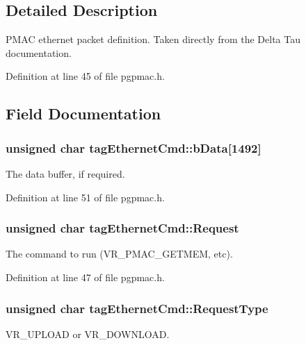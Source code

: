 \subsection{Detailed Description}
PMAC ethernet packet definition. Taken directly from the Delta Tau documentation. 

Definition at line 45 of file pgpmac.h.

\subsection{Field Documentation}
\hypertarget{structtagEthernetCmd_a872dab798127d6f589974a79c5d0aef1}{
\subsubsection[{bData}]{\setlength{\rightskip}{0pt plus 5cm}unsigned char {\bf tagEthernetCmd::bData}\mbox{[}1492\mbox{]}}}
\label{structtagEthernetCmd_a872dab798127d6f589974a79c5d0aef1}


The data buffer, if required. 

Definition at line 51 of file pgpmac.h.\hypertarget{structtagEthernetCmd_a0dc566e7edbb226f1a4ea443d93d56e2}{
\subsubsection[{Request}]{\setlength{\rightskip}{0pt plus 5cm}unsigned char {\bf tagEthernetCmd::Request}}}
\label{structtagEthernetCmd_a0dc566e7edbb226f1a4ea443d93d56e2}


The command to run (VR\_\-PMAC\_\-GETMEM, etc). 

Definition at line 47 of file pgpmac.h.\hypertarget{structtagEthernetCmd_a6a155eb3ae546dd29369c4a33ddb3310}{
\subsubsection[{RequestType}]{\setlength{\rightskip}{0pt plus 5cm}unsigned char {\bf tagEthernetCmd::RequestType}}}
\label{structtagEthernetCmd_a6a155eb3ae546dd29369c4a33ddb3310}


VR\_\-UPLOAD or VR\_\-DOWNLOAD. 

